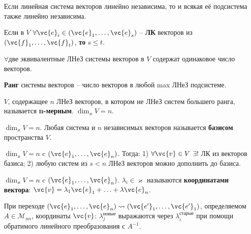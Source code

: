 \begin{to_thr}
	Если линейная система векторов линейно независима, то и всякая её подсистема также линейно независима.
\end{to_thr}	

\begin{to_thr}
	Если в $V$ $\forall \vc{e}_i \in (\vc{e}_1,\ldots,\vc{e}_s)$ -- \textbf{ЛК} векторов из $(\vc{f}_1,\ldots,\vc{f}_t)$, \textbf{то} $s \leq t$.
\end{to_thr}

\begin{to_con}
	$\forall$две эквивалентные ЛНеЗ системы векторов в $V$ содержат одинаковое число векторов.
\end{to_con}

\begin{to_def}
	\textbf{Ранг} системы векторов -- число векторов в любой max ЛНеЗ подсистеме.
\end{to_def}

\begin{to_def}
	$V$, содержащее $n$ ЛНеЗ векторов, в котором не ЛНеЗ систем большего ранга, называется \textbf{n-мерным}. $\dim_\varkappa V = n$. 
\end{to_def}

\begin{to_def}
	$\dim_\varkappa V = n$. Любая система и $n$ независимых векторов называется \textbf{базисом} пространства $V$.
\end{to_def}

\begin{to_thr}
	$\dim_\varkappa V = n$ c $( \vc{e}_1,\ldots,\vc{e}_n)$. Тогда: 1) $\forall \vc{v} \in V$ $\exists!$ ЛК из векторов базиса; 2) любую систем из $s<n$ ЛНеЗ векторов можно дополнить до базиса. 
\end{to_thr}

\begin{to_def}
	$\dim_\varkappa V = n$ c $( \vc{e}_1,\ldots,\vc{e}_n)$. $\lambda_i \in \varkappa$ называются \textbf{координатами вектора}: $\vc{v} = \lambda_1 \vc{e}_1 + \ldots + \lambda \vc{e}_n$. 
\end{to_def}

\begin{to_thr}
	При переходе $(\vc{e}_1,\ldots,\vc{e}_n) \leadsto ( \vc{e'}_1,\ldots,\vc{e'}_1)$, определяемом $A \in \mathcal{M}_{n n}$, координаты $\vc{v}$: $\lambda_j^\text{новые}$ выражаются через $\lambda_i^\text{старые}$ при помощи обратимого линейного преобразования с $A^{-1}$.
\end{to_thr}

